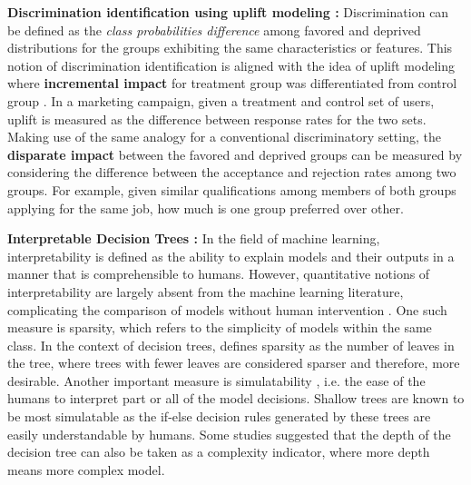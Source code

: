  \textbf{Discrimination identification using uplift modeling :} Discrimination can be defined as the {\it class probabilities difference} among favored and deprived distributions for the groups exhibiting the same characteristics or features. This notion of discrimination identification is aligned with the idea of uplift modeling where \textbf{incremental impact} for treatment group was differentiated from control group \citep{rzepakowski2010decision}. In a marketing campaign, given a treatment and control set of users, uplift is measured as the difference between response rates for the two sets. Making use of the same analogy for a conventional discriminatory setting, the \textbf{disparate impact} between the favored and deprived groups can be measured by considering the difference between the acceptance and rejection rates among two groups. For example, given similar qualifications among members of both groups applying for the same job, how much is one group preferred over other.
 

 \textbf{Interpretable Decision Trees :} In the field of machine learning, interpretability is defined as the ability to explain models and their outputs in a manner that is comprehensible to humans. However, quantitative notions of interpretability are largely absent from the machine learning literature, complicating the comparison of models without human intervention \cite{aghaei2023optimalfair}. One such measure is sparsity, which refers to the simplicity of models within the same class. In the context of decision trees, \citet{rudin2022interpretable} defines sparsity as the number of leaves in the tree, where trees with fewer leaves are considered sparser and therefore, more desirable. Another important measure is simulatability \cite{Scarpato2024}, i.e. the ease of the humans to interpret part or all of the model decisions. Shallow trees are known to be most simulatable as the if-else decision rules generated by these trees are easily understandable by humans. Some studies \cite{molnar2022, carvalho2019machine} suggested that the depth of the decision tree can also be taken as a complexity indicator, where more depth means more complex model.